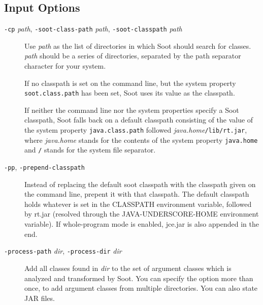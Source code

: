 \documentclass{article}
\begin{document}
\subsection{Input Options}


\begin{description}

  \item[
  {\tt -cp}{ \it path}, 
  {\tt -soot-class-path}{ \it path}, 
  {\tt -soot-classpath}{ \it path}]


\par

Use {\it path} as the list of directories in which Soot
should search for classes. {\it path} should be a series of
directories, separated by the path separator character for your
system.

\par

If no classpath is set on the command line, but the system
property {\tt soot.class.path} has been set, Soot uses its
value as the classpath.

\par

If neither the command line nor the system properties specify a
Soot classpath, Soot falls back on a default classpath consisting
of the value of the system property {\tt java.class.path}
followed {\it java.home}{\tt /lib/rt.jar}, where
{\it java.home} stands for the contents of the system property
{\tt java.home} and {\tt /} stands for the system file
separator.



  \item[
  {\tt -pp}, 
  {\tt -prepend-classpath}]


\par

Instead of replacing the default soot classpath with the classpath given on the command line,
prepent it with that classpath.
The default classpath holds whatever is set in the CLASSPATH environment variable,
followed by rt.jar (resolved through the JAVA-UNDERSCORE-HOME environment variable).
If whole-program mode is enabled, jce.jar is also appended in the end.




  \item[
  {\tt -process-path}{ \it dir}, 
  {\tt -process-dir}{ \it dir}]


\par

Add all classes found in {\it dir} to the set of argument classes
which is analyzed and transformed by Soot.  You can specify the
option more than once, to add argument classes from multiple directories.
You can also state JAR files.



\end{description}
\end{document}

